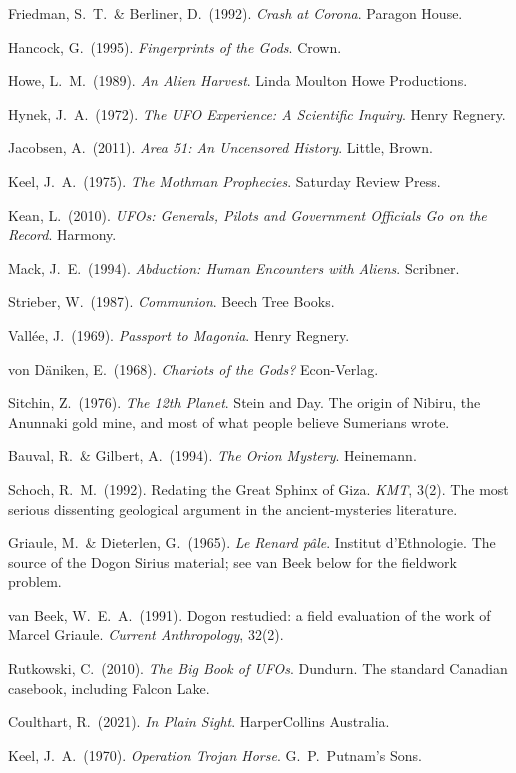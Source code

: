 \begin{list}{}{\setlength{\leftmargin}{1.2em}\setlength{\itemindent}{-1.2em}
\setlength{\itemsep}{3pt}}
\item Friedman, S.\ T.\ \& Berliner, D.\ (1992). \emph{Crash at Corona}. Paragon House.
\item Hancock, G.\ (1995). \emph{Fingerprints of the Gods}. Crown.
\item Howe, L.\ M.\ (1989). \emph{An Alien Harvest}. Linda Moulton Howe Productions.
\item Hynek, J.\ A.\ (1972). \emph{The UFO Experience: A Scientific Inquiry}. Henry Regnery.
\item Jacobsen, A.\ (2011). \emph{Area 51: An Uncensored History}. Little, Brown.
\item Keel, J.\ A.\ (1975). \emph{The Mothman Prophecies}. Saturday Review Press.
\item Kean, L.\ (2010). \emph{UFOs: Generals, Pilots and Government Officials Go on the Record}.
Harmony.
\item Mack, J.\ E.\ (1994). \emph{Abduction: Human Encounters with Aliens}. Scribner.
\item Strieber, W.\ (1987). \emph{Communion}. Beech Tree Books.
\item Vallée, J.\ (1969). \emph{Passport to Magonia}. Henry Regnery.
\item von Däniken, E.\ (1968). \emph{Chariots of the Gods?} Econ-Verlag.
\item Sitchin, Z.\ (1976). \emph{The 12th Planet}. Stein and Day. The origin of Nibiru, the
Anunnaki gold mine, and most of what people believe Sumerians wrote.
\item Bauval, R.\ \& Gilbert, A.\ (1994). \emph{The Orion Mystery}. Heinemann.
\item Schoch, R.\ M.\ (1992). Redating the Great Sphinx of Giza. \emph{KMT}, 3(2). The most
serious dissenting geological argument in the ancient-mysteries literature.
\item Griaule, M.\ \& Dieterlen, G.\ (1965). \emph{Le Renard pâle}. Institut d'Ethnologie. The
source of the Dogon Sirius material; see van Beek below for the fieldwork problem.
\item van Beek, W.\ E.\ A.\ (1991). Dogon restudied: a field evaluation of the work of Marcel
Griaule. \emph{Current Anthropology}, 32(2).
\item Rutkowski, C.\ (2010). \emph{The Big Book of UFOs}. Dundurn. The standard Canadian casebook,
including Falcon Lake.
\item Coulthart, R.\ (2021). \emph{In Plain Sight}. HarperCollins Australia.
\item Keel, J.\ A.\ (1970). \emph{Operation Trojan Horse}. G.\ P.\ Putnam's Sons.
\end{list}

